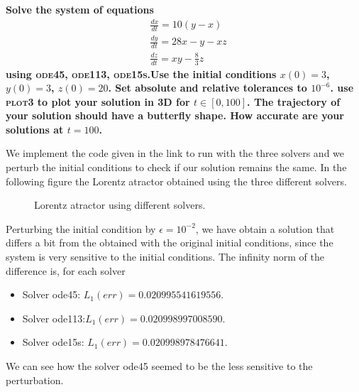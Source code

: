 \textbf{Solve the system of equations}
\begin{align*}
& \frac{dx}{dt} = 10(y-x) \\
& \frac{dy}{dt} = 28x - y - xz \\
& \frac{dz}{dt} = xy - \frac{8}{3}z
\end{align*}
\textbf{using \textsc{ode45}, \textsc{ode113}, \textsc{ode15s}.Use the initial conditions $x(0) = 3$, $y(0) = 3$, $z(0) = 20$. Set absolute and relative tolerances to $10^{-6}$. use \textsc{plot3} to plot your solution in 3D for $t \in [0,100]$. The trajectory of your solution should have a butterfly shape. How accurate are your solutions at $t = 100$.}

We implement the code given in the link to run with the three solvers and we perturb the initial conditions to check if our solution remains the same. In the following figure the Lorentz atractor obtained using the three different solvers.

\begin{figure}[H]
\centering     %
\hspace*{\fill}
\hspace*{\fill}
\hspace*{\fill}
\hspace*{\fill}
\caption{Lorentz atractor using different solvers.}
\end{figure}

Perturbing the initial condition by $\epsilon=10^{-2}$, we have obtain a solution that differs a bit from the obtained with the original initial conditions, since the system is very sensitive to the initial conditions. The infinity norm of the difference is, for each solver
\begin{itemize}
\item Solver ode45: $L_1(err)=0.020995541619556$.
\item Solver ode113:$L_1(err)= 0.020998997008590$.
\item Solver ode15s: $L_1(err)=0.020998978476641$.
\end{itemize}
We can see how the solver ode45 seemed to be the less sensitive to the perturbation.